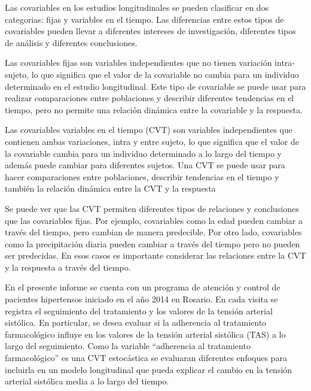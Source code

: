 \documentclass[spanish]{article}
\numberwithin{figure}{subsection}
\numberwithin{equation}{subsection}
\numberwithin{table}{subsection}
\def\fullcovname{adherencia al tratamiento farmacológico}
\begin{document}
Las covariables en los estudios longitudinales se pueden clasificar en dos
categorias: fijas y variables en el tiempo. Las diferencias entre estos tipos
de covariables pueden llevar a diferentes intereses de investigación,
diferentes tipos de análisis y diferentes conclusiones.

Las covariables fijas son variables independientes que no tienen variación
intra-sujeto, lo que significa que el valor de la covariable no cambia para un
individuo determinado en el estudio longitudinal. Este tipo de covariable se
puede usar para realizar comparaciones entre poblaciones y describir diferentes
tendencias en el tiempo, pero no permite una relación dinámica entre la
covariable y la respuesta.

Las covariables variables en el tiempo (CVT) son variables independientes que
contienen ambas variaciones, intra y entre sujeto, lo que significa que el
valor de la covariable cambia para un individuo determinado a lo largo del
tiempo y además puede cambiar para diferentes sujetos. Una CVT se puede usar
para hacer comparaciones entre poblaciones, describir tendencias en el tiempo y
también la relación dinámica entre la CVT y la respuesta

Se puede ver que las CVT permiten diferentes tipos de relaciones y conclusiones
que las covariables fijas. Por ejemplo, covariables como la edad pueden cambiar
a través del tiempo, pero cambian de manera predecible. Por otro lado,
covariables como la precipitación diaria pueden cambiar a través del tiempo
pero no pueden ser predecidas. En esos casos es importante considerar las
relaciones entre la CVT y la respuesta a través del tiempo.

En el presente informe se cuenta con un programa de atención y control de
pacientes hipertensos iniciado en el año 2014 en Rosario. En cada visita se
registra el seguimiento del tratamiento y los valores de la tensión arterial
sistólica. En particular, se desea evaluar si la adherencia al tratamiento
farmacológico influye en los valores de la tensión arterial sistólica (TAS) a
lo largo del seguimiento. Como la variable “\fullcovname{}” es una CVT
estocástica se evaluaran diferentes enfoques para incluirla en un modelo
longitudinal que pueda explicar el cambio en la tensión arterial sistólica
media a lo largo del tiempo.

\end{document}
